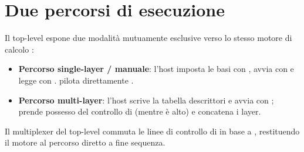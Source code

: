\section{Due percorsi di esecuzione}
Il top-level espone due modalità mutuamente esclusive verso lo stesso motore di
calcolo :
\begin{itemize}
\item \textbf{Percorso single-layer / manuale}: l'host imposta le basi con
, avvia con  e legge con . 
pilota direttamente .
\item \textbf{Percorso multi-layer}: l'host scrive la tabella descrittori e avvia con
;  prende possesso del controllo di
 (mentre  è alto) e concatena i layer.
\end{itemize}
Il multiplexer del top-level commuta le linee di controllo di 
in base a , restituendo il motore al percorso diretto a fine sequenza.
